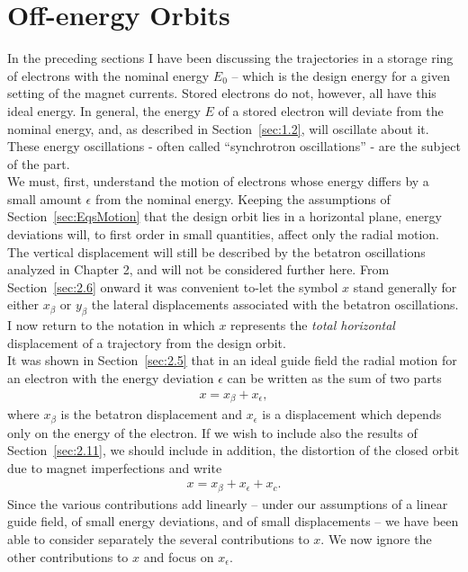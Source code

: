 \section{Off-energy Orbits}\label{sec:3.1}

In the preceding sections I have been discussing the trajectories in a storage ring of electrons with the nominal energy $E_0$ -- which is the design energy for a given setting of the magnet currents. Stored electrons do not, however, all have this ideal energy. In general, the energy $E$ of a stored electron will deviate from the nominal energy, and, as described in Section~\ref{sec:1.2}, will oscillate about it. These energy oscillations - often called “synchrotron oscillations” - are the subject of the part.\\
We must, first, understand the motion of electrons whose energy differs by a small amount $\epsilon$ from the nominal energy. Keeping the assumptions of Section~\ref{sec:EqsMotion} that the design orbit lies in a horizontal plane, energy deviations will, to first order in small quantities, affect only the radial motion. The vertical displacement will still be described by the betatron oscillations analyzed in Chapter 2, and will not be considered further here. From Section~\ref{sec:2.6} onward it was convenient to-let the symbol $x$ stand generally for either $x_\beta$ or $y_\beta$ the lateral displacements associated with the betatron oscillations. I now return to the notation in which $x$ represents the \emph{total horizontal} displacement of a trajectory from the design orbit.\\
It was shown in Section~\ref{sec:2.5} that in an ideal guide field the radial motion for
an electron with the energy deviation $\epsilon$ can be written as the sum of two parts
\begin{align}
	x = x_\beta+x_\epsilon,
\end{align}
where $x_\beta$ is the betatron displacement and $x_\epsilon$ is a displacement which depends
only on the energy of the electron. If we wish to include also the results of Section~\ref{sec:2.11}, we should include in addition, the distortion of the closed orbit due to magnet imperfections and write
\begin{align}
	x = x_\beta+x_\epsilon+x_c.
\end{align}
Since the various contributions add linearly -- under our assumptions of a linear guide field, of
 small energy deviations, and of small displacements -- we have been able to consider separately
 the several contributions to $x$. We now ignore the other contributions to $x$ and focus on $x_\epsilon$.
